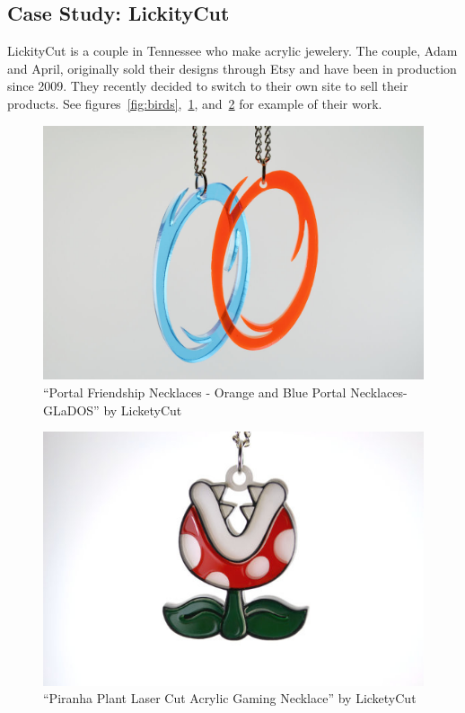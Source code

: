 \documentclass[12pt singlecol]{article}
\begin{document}
\begin{flushleft}
\subsection{Case Study: LickityCut}

LickityCut is a couple in Tennessee who make acrylic jewelery. The couple, Adam and April, originally sold their designs through Etsy and have been in production since 2009. They recently decided to switch to their own site to sell their products. See figures~\ref{fig:birds},~\ref{fig:lcportal}, and~\ref{fig:lcplant} for example of their work.

\begin{figure}
  \centering  
  \includegraphics[width=\linewidth]{lcportal}
  \caption{``Portal Friendship Necklaces - Orange and Blue Portal Necklaces- GLaDOS'' by LicketyCut \cite{licketycut13}}
  \label{fig:lcportal}
\end{figure}	

\begin{figure}
  \centering  
  \includegraphics[width=\linewidth]{lcplant}
  \caption{``Piranha Plant Laser Cut Acrylic Gaming Necklace'' by LicketyCut \cite{licketycut13}}
  \label{fig:lcplant}
\end{figure}	


\end{flushleft}
\end{document}
